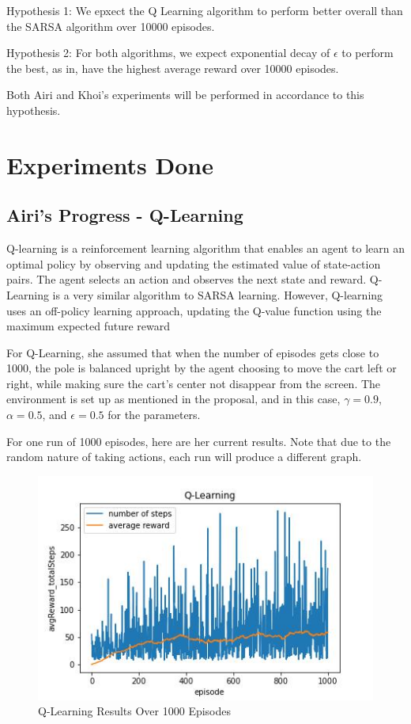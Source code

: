 \documentclass[nohyperref]{article}
\theoremstyle{plain}
\theoremstyle{definition}
\theoremstyle{remark}
\begin{document}
Hypothesis 1: We epxect the Q Learning algorithm to perform better overall than the SARSA algorithm over 10000 episodes.

Hypothesis 2: For both algorithms, we expect exponential decay of $\epsilon$ to perform the best, as in, have the highest average reward over 10000 episodes.

Both Airi and Khoi's experiments will be performed in accordance to this hypothesis.

\section{Experiments Done}

\subsection{Airi's Progress - Q-Learning}
Q-learning is a reinforcement learning algorithm that enables an agent to learn an optimal policy by observing and updating the estimated value of state-action pairs. 
The agent selects an action and observes the next state and reward.
Q-Learning is a very similar algorithm to SARSA learning. However, Q-learning uses an off-policy learning approach, updating the Q-value function using the maximum expected future reward

For Q-Learning, she assumed that when the number of episodes gets close to 1000, the pole is balanced upright by the agent choosing to move the cart left or right, while making sure the cart's center not disappear from the screen. 
The environment is set up as mentioned in the proposal, and in this case, $\gamma = 0.9$, $\alpha = 0.5$, and $\epsilon = 0.5$ for the parameters.  

For one run of 1000 episodes, here are her current results. Note that due to the random nature of taking actions, each run will produce a different graph.

\begin{figure}[H] %
    \centering
    \includegraphics[width=1\linewidth]{q-learning-average-1k.png}
    \caption{Q-Learning Results Over 1000 Episodes}
\end{figure}
\end{document}
